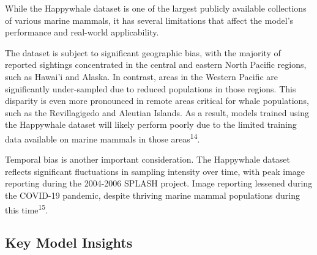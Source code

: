 \documentclass[twocolumn]{article}
\begin{document}
While the Happywhale dataset is one of the largest publicly available collections of various marine mammals, it has several limitations that affect the model's performance and real-world applicability. 

The dataset is subject to significant geographic bias, with the majority of reported sightings concentrated in the central and eastern North Pacific regions, such as Hawai'i and Alaska. In contrast, areas in the Western Pacific are significantly under-sampled due to reduced populations in those regions. This disparity is even more pronounced in remote areas critical for whale populations, such as the Revillagigedo and Aleutian Islands. As a result, models trained using the Happywhale dataset will likely perform poorly due to the limited training data available on marine mammals in those areas\textsuperscript{14}.

Temporal bias is another important consideration. The Happywhale dataset reflects significant fluctuations in sampling intensity over time, with peak image reporting during the 2004-2006 SPLASH project. Image reporting lessened during the COVID-19 pandemic, despite thriving marine mammal populations during this time\textsuperscript{15}. 

\subsection{Key Model Insights}
\end{document}
